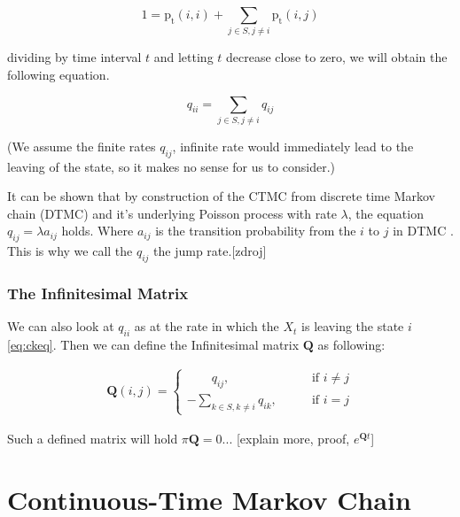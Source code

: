 \documentclass[thesis=M,english]{FITthesis}[2012/10/20]
\newcommand{\matr}[1]{\mathbf{#1}}
\begin{document}
\begin{equation}
1 = \mathrm{p_t}(i,i) + \sum_{j \in S ,j \neq i} \mathrm{p_t}(i,j) 
\end{equation}

dividing by time interval $t$ and letting $t$ decrease close to zero, we will obtain the following equation. 

\begin{equation}\label{eq:qii}
 q_{ii} =  \sum_{j \in S ,j \neq i} q_{ij} 
\end{equation}

(We assume the finite rates $q_{ij}$, infinite rate would immediately lead to the leaving of the state, so it makes no sense for us to consider.)

It can be shown that by construction of the CTMC from discrete time Markov chain (DTMC) and  it's underlying Poisson process with rate $\lambda$, the equation $q_{ij} = \lambda a_{ij}$ holds. Where $a_{ij}$ is the transition probability from the $i$ to $j$ in DTMC \label{eq:tp}. This is why we call the $q_{ij}$ the jump rate.[zdroj]  


\subsubsection{The Infinitesimal Matrix}

We can also look at $q_{ii}$ as at the rate in which the $X_t$ is leaving the state $i$ \eqref{eq:ckeq}. Then we can define the Infinitesimal matrix $\matr{Q}$ as following:

\begin{equation}
\begin{aligned}  
\matr{Q}(i,j)= 
\begin{cases}
\qquad q_{ij}, \qquad & \text{if } i\neq j\\
- \sum\limits_{k \in S ,k \neq i} q_{ik}, \qquad & \text{if } i=j
\end{cases}
\end{aligned}
\end{equation}

Such a defined matrix will hold $\pi\matr{Q} = 0$... [explain more, proof, $e^{\matr{Q}t}$]

\section{ Continuous-Time Markov Chain }
\end{document}
